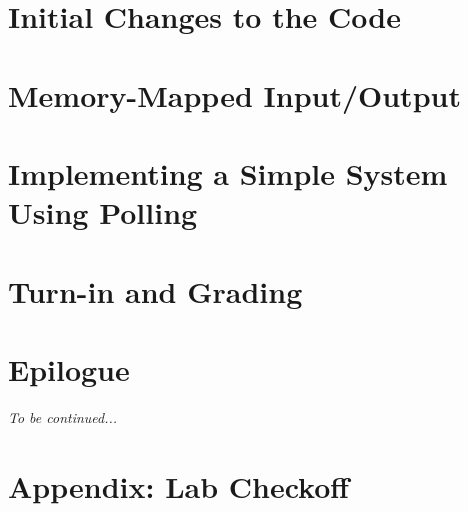     \section{Initial Changes to the Code} \label{sec:LabTime}                       

    \section{Memory-Mapped Input/Output} \label{sec:MemMapIO}                       

    \section {Implementing a Simple System Using Polling} \label{sec:SimpleSystem}  

    \section{Turn-in and Grading}                                                   

    \section*{Epilogue}                                                             \JeffGoldblum

    \textit{To be continued...}

    \newpage\appendix

    \section{Appendix: Lab Checkoff}                                                


